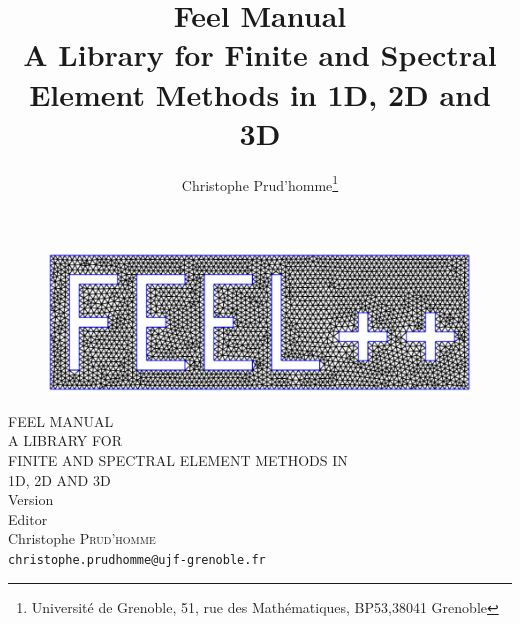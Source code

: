 \documentclass[a4paper]{book}
\title{Feel Manual\\
A Library for Finite and Spectral Element Methods in 1D, 2D and 3D\\
{\small \feelversion }}
\author{Christophe Prud'homme\thanks{Université de Grenoble,
51, rue des Mathématiques, BP53,38041 Grenoble}}
\date{}
\begin{document}
\thispagestyle{empty}





\begin{figure}[!h]
\centering
\includegraphics[width=.60\linewidth]{feel_logo.png}
\end{figure}


\begin{center}
  {\Large
    FEEL MANUAL \\
    A LIBRARY FOR \\
    FINITE AND SPECTRAL ELEMENT METHODS IN \\
    1D, 2D AND 3D\\
    \bigskip
    {\small Version \feelversion }}\\[0.6cm]
    Editor\\
  Christophe \textsc{Prud'homme}\\
  \texttt{christophe.prudhomme@ujf-grenoble.fr}\\
  \par\vspace{2cm}




\end{center}
\end{document}
